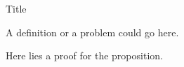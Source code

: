\documentclass[12pt]{article}
\begin{document}
\begin{e}{Title}

    \begin{pb}

        A definition or a problem could go here.

    \end{pb}

    \begin{pf}
        
        Here lies a proof for the proposition.

    \end{pf}

\end{e}
\end{document}
